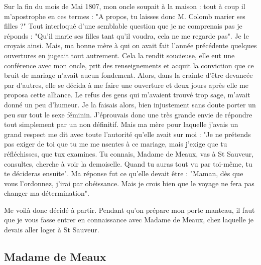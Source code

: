 \documentclass[11pt,a4paper]{report}
\begin{document}
Sur la fin du mois de Mai 1807, mon oncle soupait à la maison : tout à coup il m'apostrophe en ces termes : "A propos, tu laisses donc M. Colomb marier ses filles ?" Tout interloqué d'une semblable question que je ne comprenais pas je réponds : "Qu'il marie ses filles tant qu'il voudra, cela ne me regarde pas". Je le croyais ainsi. Mais, ma bonne mère à qui on avait fait l'année précédente quelques ouvertures en jugeait tout autrement. Cela la rendit soucieuse, elle eut une conférence avec mon oncle, prit des renseignements et acquit la conviction que ce bruit de mariage n'avait aucun fondement. Alors, dans la crainte d'être devancée par d'autres, elle se décida à me faire une ouverture et deux jours après elle me proposa cette alliance. Le refus des gens qui m'avaient trouvé trop sage, m'avait donné un peu d'humeur. Je la faisais alors, bien injustement sans doute porter un peu sur tout le sexe féminin. J'éprouvais donc une très grande envie de répondre tout simplement par un non définitif. Mais ma mère pour laquelle j'avais un grand respect me dit avec toute l'autorité qu'elle avait sur moi : "Je ne prétends pas exiger de toi que tu me me nsentes à ce mariage, mais j'exige que tu réfléchisses, que tux examines. Tu connais, Madame de Meaux, vas à St Sauveur, consultes, cherche à voir la demoiselle. Quand tu auras tout vu par toi-même, tu te décideras ensuite". Ma réponse fut ce qu'elle devait être : "Maman, dès que vous l'ordonnez, j'irai par obéissance. Mais je crois bien que le voyage ne fera pas changer ma détermination".

Me voilà donc décidé à partir. Pendant qu'on prépare mon porte manteau, il faut que je vous fasse entrer en connaissance avec Madame de Meaux, chez laquelle je devais aller loger à St Sauveur.

\subsection*{Madame de Meaux}
\end{document}
